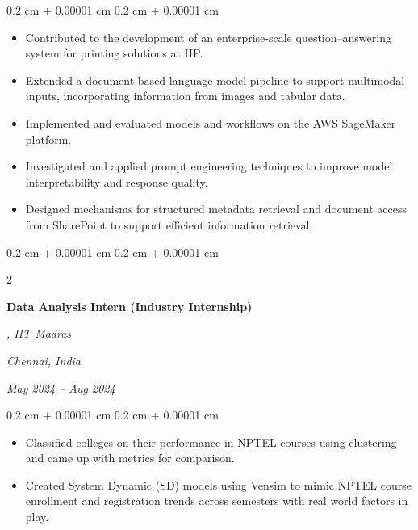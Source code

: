 \documentclass[10pt, letterpaper]{article}
\newenvironment{highlights}{
    \begin{itemize}[
        topsep=0.10 cm,
        parsep=0.10 cm,
        partopsep=0pt,
        itemsep=0pt,
        leftmargin=0.4 cm + 10pt
    ]
}{
    \end{itemize}
} %
\newenvironment{onecolentry}{
    \begin{adjustwidth}{
        0.2 cm + 0.00001 cm
    }{
        0.2 cm + 0.00001 cm
    }
}{
    \end{adjustwidth}
} %
\newenvironment{twocolentry}[2][]{
    \onecolentry
    \def\secondColumn{#2}
    \setcolumnwidth{\fill, 6.5 cm}
    \begin{paracol}{2}
}{
    \switchcolumn \raggedleft \secondColumn
    \end{paracol}
    \endonecolentry
} %
\let\hrefWithoutArrow\href
\renewcommand{\href}[2]{\hrefWithoutArrow{#1}{\ifthenelse{\equal{#2}{}}{ }{#2 }\raisebox{.15ex}{\footnotesize \faExternalLink*}}}
\begin{document}
        \vspace{0.10 cm}
        \begin{onecolentry}
            \begin{highlights}
                \item Contributed to the development of an enterprise-scale question–answering system for printing solutions at HP.
                \item Extended a document-based language model pipeline to support multimodal inputs, incorporating information from images and tabular data.
                \item Implemented and evaluated models and workflows on the AWS SageMaker platform.
                \item Investigated and applied prompt engineering techniques to improve model interpretability and response quality.
                \item Designed mechanisms for structured metadata retrieval and document access from SharePoint to support efficient information retrieval.
            \end{highlights}
        \end{onecolentry}

        \vspace{0.2 cm}

        \begin{twocolentry}{
        \textit{Chennai, India}    
            
        \textit{May 2024 – Aug 2024}}
            \textbf{Data Analysis Intern (Industry Internship)}
            
            \textit{\href{https://nptel.ac.in/}{NPTEL}, IIT Madras}
        \end{twocolentry}

        \vspace{0.10 cm}
        \begin{onecolentry}
            \begin{highlights}
                \item Classified colleges on their performance in NPTEL courses using clustering and came up with metrics for comparison.
                \item Created System Dynamic (SD) models using Vensim to mimic NPTEL course enrollment and registration trends across semesters with real world factors in play.
            \end{highlights}
        \end{onecolentry}
    
\end{document}

